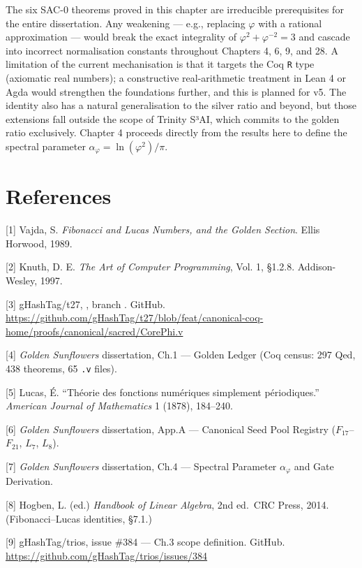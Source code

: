 The six SAC-0 theorems proved in this chapter are
irreducible prerequisites for the entire
dissertation. Any weakening --- e.g., replacing
\(\varphi\) with a rational approximation ---
would break the exact integrality of
\(\varphi^2 + \varphi^{-2} = 3\) and cascade into
incorrect normalisation constants throughout
Chapters 4, 6, 9, and 28. A limitation of the
current mechanisation is that it targets the Coq
\texttt{R} type (axiomatic real numbers); a
constructive real-arithmetic treatment in Lean 4
or Agda would strengthen the foundations further,
and this is planned for v5. The identity also has
a natural generalisation to the silver ratio and
beyond, but those extensions fall outside the
scope of Trinity S³AI, which commits to the golden
ratio exclusively. Chapter 4 proceeds directly
from the results here to define the spectral
parameter \(\alpha_\varphi = \ln(\varphi^2)/\pi\).

\section{References}\label{fa_03:references}

[1] Vajda, S. \emph{Fibonacci and Lucas
Numbers, and the Golden Section}. Ellis Horwood,
1989.

[2] Knuth, D. E. \emph{The Art of Computer
Programming}, Vol. 1, §1.2.8. Addison-Wesley,
1997.

[3] gHashTag/t27,
, branch
. GitHub.
\url{https://github.com/gHashTag/t27/blob/feat/canonical-coq-home/proofs/canonical/sacred/CorePhi.v}

[4] \emph{Golden Sunflowers} dissertation,
Ch.1 --- Golden Ledger (Coq census: 297 Qed, 438
theorems, 65 \texttt{.v} files).

[5] Lucas, É. ``Théorie des fonctions
numériques simplement périodiques.''
\emph{American Journal of Mathematics} 1 (1878),
184--240.

[6] \emph{Golden Sunflowers} dissertation,
App.A --- Canonical Seed Pool Registry
(\(F_{17}\)--\(F_{21}\), \(L_7\), \(L_8\)).

[7] \emph{Golden Sunflowers} dissertation,
Ch.4 --- Spectral Parameter \(\alpha_\varphi\) and
Gate Derivation.

[8] Hogben, L. (ed.) \emph{Handbook of Linear
Algebra}, 2nd ed.~CRC Press, 2014.
(Fibonacci--Lucas identities, §7.1.)

[9] gHashTag/trios, issue \#384 --- Ch.3 scope
definition. GitHub.
\url{https://github.com/gHashTag/trios/issues/384}

